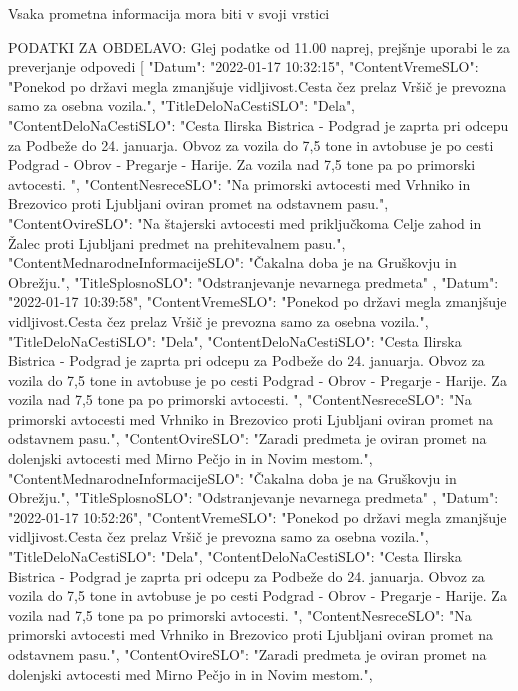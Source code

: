 \documentclass[fleqn,moreauthors,10pt]{ds_report}
\begin{document}
\begin{scriptsize}
    Vsaka prometna informacija mora biti v svoji vrstici

PODATKI ZA OBDELAVO:
Glej podatke od 11.00 naprej, prejšnje uporabi le za preverjanje odpovedi
[
    {
        "Datum": "2022-01-17 10:32:15",
        "ContentVremeSLO": "Ponekod po državi megla zmanjšuje vidljivost.Cesta čez prelaz Vršič je prevozna samo za osebna vozila.",
        "TitleDeloNaCestiSLO": "Dela",
        "ContentDeloNaCestiSLO": "Cesta Ilirska Bistrica - Podgrad je zaprta pri odcepu za Podbeže do 24. januarja. Obvoz za vozila do 7,5 tone in avtobuse je po cesti Podgrad - Obrov - Pregarje - Harije. Za vozila nad 7,5 tone pa po primorski avtocesti. ",
        "ContentNesreceSLO": "Na primorski avtocesti med Vrhniko in Brezovico proti Ljubljani oviran promet na odstavnem pasu.",
        "ContentOvireSLO": "Na štajerski avtocesti med priključkoma Celje zahod in Žalec proti Ljubljani predmet na prehitevalnem pasu.",
        "ContentMednarodneInformacijeSLO": "Čakalna doba je na Gruškovju in Obrežju.",
        "TitleSplosnoSLO": "Odstranjevanje nevarnega predmeta"
    },
    {
        "Datum": "2022-01-17 10:39:58",
        "ContentVremeSLO": "Ponekod po državi megla zmanjšuje vidljivost.Cesta čez prelaz Vršič je prevozna samo za osebna vozila.",
        "TitleDeloNaCestiSLO": "Dela",
        "ContentDeloNaCestiSLO": "Cesta Ilirska Bistrica - Podgrad je zaprta pri odcepu za Podbeže do 24. januarja. Obvoz za vozila do 7,5 tone in avtobuse je po cesti Podgrad - Obrov - Pregarje - Harije. Za vozila nad 7,5 tone pa po primorski avtocesti. ",
        "ContentNesreceSLO": "Na primorski avtocesti med Vrhniko in Brezovico proti Ljubljani oviran promet na odstavnem pasu.",
        "ContentOvireSLO": "Zaradi predmeta je oviran promet na dolenjski avtocesti med Mirno Pečjo in in Novim mestom.",
        "ContentMednarodneInformacijeSLO": "Čakalna doba je na Gruškovju in Obrežju.",
        "TitleSplosnoSLO": "Odstranjevanje nevarnega predmeta"
    },
    {
        "Datum": "2022-01-17 10:52:26",
        "ContentVremeSLO": "Ponekod po državi megla zmanjšuje vidljivost.Cesta čez prelaz Vršič je prevozna samo za osebna vozila.",
        "TitleDeloNaCestiSLO": "Dela",
        "ContentDeloNaCestiSLO": "Cesta Ilirska Bistrica - Podgrad je zaprta pri odcepu za Podbeže do 24. januarja. Obvoz za vozila do 7,5 tone in avtobuse je po cesti Podgrad - Obrov - Pregarje - Harije. Za vozila nad 7,5 tone pa po primorski avtocesti. ",
        "ContentNesreceSLO": "Na primorski avtocesti med Vrhniko in Brezovico proti Ljubljani oviran promet na odstavnem pasu.",
        "ContentOvireSLO": "Zaradi predmeta je oviran promet na dolenjski avtocesti med Mirno Pečjo in in Novim mestom.",
}
\end{scriptsize}
\end{document}
